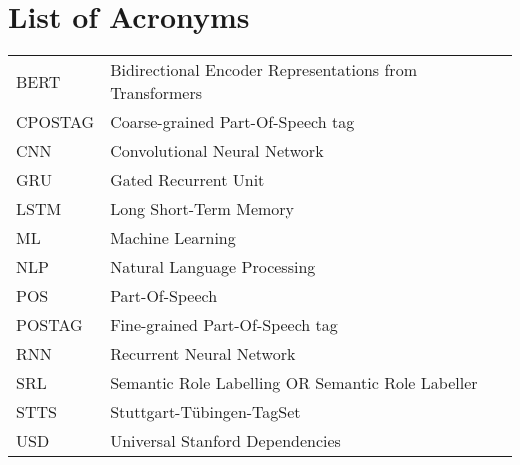 {}
\chapter*{List of Acronyms}

\begin{supertabular}{lp{12.5cm}}
BERT & Bidirectional Encoder Representations from Transformers\\
CPOSTAG &  Coarse-grained Part-Of-Speech tag\\
CNN & Convolutional Neural Network\\
GRU & Gated Recurrent Unit\\
LSTM & Long Short-Term Memory\\
ML & Machine Learning\\
NLP & Natural Language Processing\\
POS & Part-Of-Speech\\
POSTAG & Fine-grained Part-Of-Speech tag\\
RNN & Recurrent Neural Network\\
SRL & Semantic Role Labelling OR Semantic Role Labeller\\
STTS & Stuttgart-Tübingen-TagSet\\
USD & Universal Stanford Dependencies\\
\end{supertabular}

\newpage
